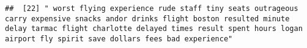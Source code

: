 \documentclass[
]{article}
\begin{document}
\begin{verbatim}
##  [22] " worst flying experience rude staff tiny seats outrageous carry expensive snacks andor drinks flight boston resulted minute delay tarmac flight charlotte delayed times result spent hours logan airport fly spirit save dollars fees bad experience"                                                                                                                                                                                                                                                                                                                                                                                                                                                                                                                                                                                                                                                                                                                                                                                                                                                                                                                                                                                                                                                                                                                                                                                                                                                                                                                                                                                                                                                                                                                                          

\end{verbatim}
\end{document}
